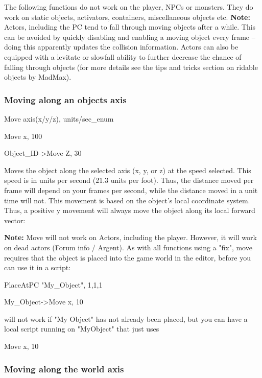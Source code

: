 \documentclass[
]{article}
\begin{document}
The following functions do not work on the player, NPCs or monsters.
They do work on static objects, activators, containers, miscellaneous
objects etc. \textbf{Note:} Actors, including the PC tend to fall
through moving objects after a while. This can be avoided by quickly
disabling and enabling a moving object every frame -- doing this
apparently updates the collision information. Actors can also be
equipped with a levitate or slowfall ability to further decrease the
chance of falling through objects (for more details see the tips and
tricks section on ridable objects by MadMax).

\hypertarget{moving-along-an-objects-axis}{%
\subsubsection{Moving along an objects
axis}\label{moving-along-an-objects-axis}}

Move axis(x/y/z), units/sec\_enum

Move x, 100

Object\_ID-\textgreater Move Z, 30

Moves the object along the selected axis (x, y, or z) at the speed
selected. This speed is in units per second (21.3 units per foot). Thus,
the distance moved per frame will depend on your frames per second,
while the distance moved in a unit time will not. This movement is based
on the object's local coordinate system. Thus, a positive y movement
will always move the object along its local forward vector:

\textbf{Note:} Move will not work on Actors, including the player.
However, it will work on dead actors (Forum info / Argent). As with all
functions using a "fix", move requires that the object is placed into
the game world in the editor, before you can use it in a script:

PlaceAtPC "My\_Object", 1,1,1

My\_Object-\textgreater Move x, 10

will not work if "My Object" has not already been placed, but you can
have a local script running on "MyObject" that just uses

Move x, 10

\hypertarget{moving-along-the-world-axis}{%
\subsubsection{Moving along the world
axis}\label{moving-along-the-world-axis}}
\end{document}
